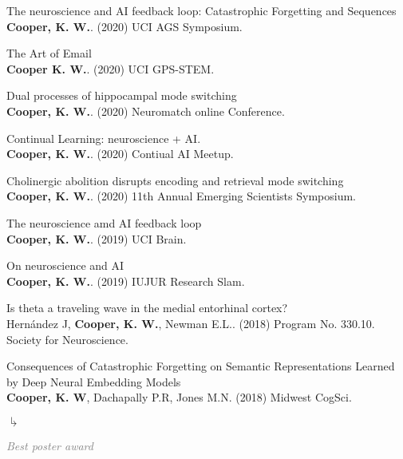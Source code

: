 \documentclass[10pt]{cooperCV2}
\begin{document}
\begin{etaremune}[itemindent=-1.5\bibhang, topsep=0pt,
				   itemsep=\bibsep,partopsep=0pt,parsep=0pt,leftmargin={\bibhang+\widthof{[999]}}]
	
    \item The neuroscience and AI feedback loop: Catastrophic Forgetting and Sequences\\ \textbf{Cooper, K. W.}. (2020) UCI AGS Symposium. 
     
	
    \item The Art of Email\\ \textbf{Cooper K. W.}. (2020) UCI GPS-STEM. 
     
	
    \item Dual processes of hippocampal mode switching\\ \textbf{Cooper, K. W.}. (2020) Neuromatch online Conference. 
     
	
    \item Continual Learning: neuroscience + AI.\\ \textbf{Cooper, K. W.}. (2020) Contiual AI Meetup. 
     
	
    \item Cholinergic abolition disrupts encoding and retrieval mode switching\\ \textbf{Cooper, K. W.}. (2020) 11th Annual Emerging Scientists Symposium. 
     
	
    \item The neuroscience amd AI feedback loop\\ \textbf{Cooper, K. W.}. (2019) UCI Brain. 
     
	
    \item On neuroscience and AI\\ \textbf{Cooper, K. W.}. (2019) IUJUR Research Slam. 
     
	
    \item Is theta a traveling wave in the medial entorhinal cortex?\\ Hernández J, \textbf{Cooper, K. W.}, Newman E.L.. (2018) Program No. 330.10. Society for Neuroscience. 
     
	
    \item Consequences of Catastrophic Forgetting on Semantic Representations Learned by Deep Neural Embedding Models\\ \textbf{Cooper, K. W}, Dachapally P.R, Jones M.N. (2018) Midwest CogSci. 
     
     	\begin{list}{$\drsh$}{}
     	
	     \item  \textcolor{grey}{\textit{Best poster award} }
     	
     	\end{list}
     

\end{etaremune}
\end{document}
